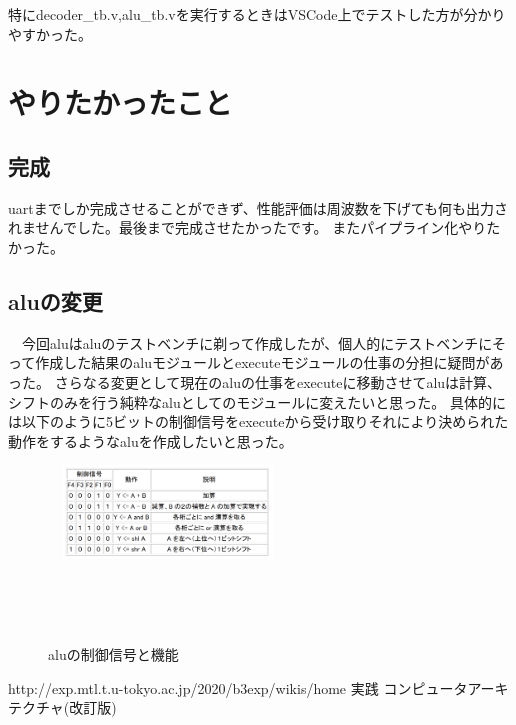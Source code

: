 \documentclass[a4paper,11pt]{jsarticle}
\begin{document}
特にdecoder\_tb.v,alu\_tb.vを実行するときはVSCode上でテストした方が分かりやすかった。


\section{やりたかったこと}
\subsection{完成}
uartまでしか完成させることができず、性能評価は周波数を下げても何も出力されませんでした。最後まで完成させたかったです。
またパイプライン化やりたかった。

\subsection{aluの変更}
　今回aluはaluのテストベンチに剃って作成したが、個人的にテストベンチにそって作成した結果のaluモジュールとexecuteモジュールの仕事の分担に疑問があった。
さらなる変更として現在のaluの仕事をexecuteに移動させてaluは計算、シフトのみを行う純粋なaluとしてのモジュールに変えたいと思った。
具体的には以下のように5ビットの制御信号をexecuteから受け取りそれにより決められた動作をするようなaluを作成したいと思った。
\begin{figure}[H]
 \centering
　\includegraphics[width=0.5\textwidth]{2020-12-28-21-21-30.png}
 
　\caption{aluの制御信号と機能}
　\label{fig:}
\end{figure}


\begin{thebibliography}{9}
     http://exp.mtl.t.u-tokyo.ac.jp/2020/b3exp/wikis/home
    実践 コンピュータアーキテクチャ(改訂版)





\end{thebibliography}
\end{document}
